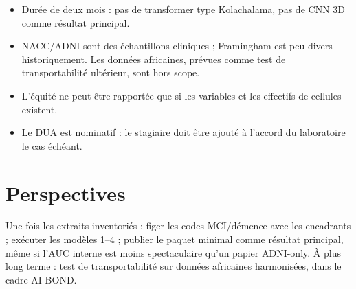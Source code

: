 \begin{itemize}[label=, font=\large \color{darkorange}]
\item Durée de deux mois : pas de transformer type Kolachalama, pas de CNN 3D comme résultat principal.
\item NACC/ADNI sont des échantillons cliniques ; Framingham est peu divers historiquement. Les données africaines, prévues comme test de transportabilité ultérieur, sont hors scope.
\item L'équité ne peut être rapportée que si les variables et les effectifs de cellules existent.
\item Le DUA est nominatif : le stagiaire doit être ajouté à l'accord du laboratoire le cas échéant.
\end{itemize}

\section{Perspectives}

Une fois les extraits inventoriés : figer les codes MCI/démence avec les encadrants ; exécuter les modèles 1--4 ; publier le paquet minimal comme résultat principal, même si l'AUC interne est moins spectaculaire qu'un papier ADNI-only. À plus long terme : test de transportabilité sur données africaines harmonisées, dans le cadre AI-BOND.

